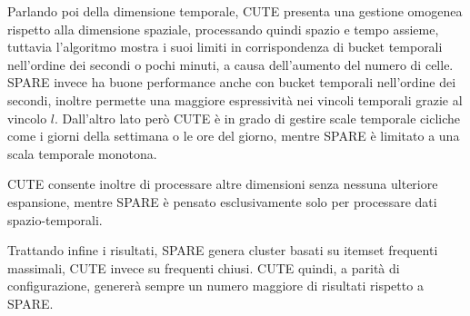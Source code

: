 Parlando poi della dimensione temporale, CUTE presenta una gestione omogenea rispetto alla dimensione spaziale, processando quindi spazio e tempo assieme, tuttavia l'algoritmo mostra i suoi limiti in corrispondenza di bucket temporali nell'ordine dei secondi o pochi minuti, a causa dell'aumento del numero di celle. 
SPARE invece ha buone performance anche con bucket temporali nell'ordine dei secondi, inoltre permette una maggiore espressività nei vincoli temporali grazie al vincolo \(l\).
Dall'altro lato però CUTE è in grado di gestire scale temporale cicliche come i giorni della settimana o le ore del giorno, mentre SPARE è limitato a una scala temporale monotona.

CUTE consente inoltre di processare altre dimensioni senza nessuna ulteriore espansione, mentre SPARE è pensato esclusivamente solo per processare dati spazio-temporali.

Trattando infine i risultati, SPARE genera cluster basati su itemset frequenti massimali, CUTE invece su frequenti chiusi. 
CUTE quindi, a parità di configurazione, genererà sempre un numero maggiore di risultati rispetto a SPARE.